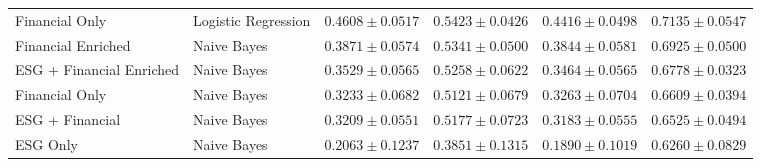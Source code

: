 \begin{table}[htbp]
\begin{tabular}{llrrrr}
    Financial Only & Logistic Regression & $0.4608 \pm 0.0517$ & $0.5423 \pm 0.0426$ & $0.4416 \pm 0.0498$ & $0.7135 \pm 0.0547$ \\
    Financial Enriched & Naive Bayes & $0.3871 \pm 0.0574$ & $0.5341 \pm 0.0500$ & $0.3844 \pm 0.0581$ & $0.6925 \pm 0.0500$ \\
    ESG + Financial Enriched & Naive Bayes & $0.3529 \pm 0.0565$ & $0.5258 \pm 0.0622$ & $0.3464 \pm 0.0565$ & $0.6778 \pm 0.0323$ \\
    Financial Only & Naive Bayes & $0.3233 \pm 0.0682$ & $0.5121 \pm 0.0679$ & $0.3263 \pm 0.0704$ & $0.6609 \pm 0.0394$ \\
    ESG + Financial & Naive Bayes & $0.3209 \pm 0.0551$ & $0.5177 \pm 0.0723$ & $0.3183 \pm 0.0555$ & $0.6525 \pm 0.0494$ \\
    ESG Only & Naive Bayes & $0.2063 \pm 0.1237$ & $0.3851 \pm 0.1315$ & $0.1890 \pm 0.1019$ & $0.6260 \pm 0.0829$ \\
    \bottomrule
  \end{tabular}
\end{table}